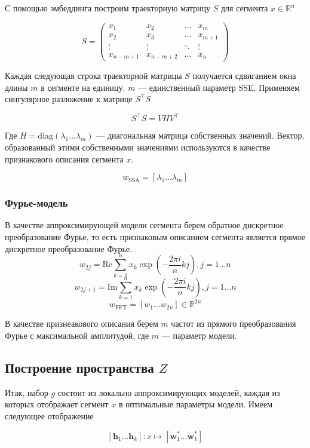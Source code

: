 \documentclass[12pt, fleqn, unicode]{article}
\newcommand{\bw}{\mathbf{w}}
\newcommand{\bh}{\mathbf{h}}
\newcommand{\R}{\mathbb{R}}
\newcommand{\brs}[1]{\left(#1\right)}
\newcommand{\sbrs}[1]{\left[#1\right]}
\begin{document}
С помощью эмбеддинга построим траекторную матрицу $S$ для сегмента $x \in \R^n$

$$
S = \begin{pmatrix}
x_1 & x_2 & \dots & x_m \\
x_2 & x_3 & \dots & x_{m + 1} \\
\vdots & \vdots & \ddots & \vdots \\
x_{n - m + 1} & x_{n - m + 2} & \dots & x_n
\end{pmatrix}
$$

Каждая следующая строка траекторной матрицы $S$ получается сдвиганием окна
длины $m$ в сегменте на единицу. $m$ --- единственный параметр SSE.
Применяем сингулярное разложение к матрице $S^\intercal S$

$$
S^\intercal S = VHV^\intercal
$$

Где $H = \mathrm{diag}(\lambda_1\ldots \lambda_m)$ --- диагональная матрица
собственных значений. Вектор, образованный этими собственными значениями
используются в качестве признакового описания сегмента $x$.

$$
w_{\text{SSA}} = [\lambda_1 \ldots \lambda_m]
$$

\subsubsection{Фурье-модель}

В качестве аппроксимирующей модели сегмента берем обратное дискретное
преобразование Фурье,
то есть признаковым описанием сегмента является прямое дискретное преобразование
Фурье.
$$
    w_{2j} = \mathrm{Re} \sum_{k=1}^{n} x_k \exp\brs{-\frac{2\pi i}{n}kj}, j=1\ldots n
$$
$$
    w_{2j + 1} = \mathrm{Im} \sum_{k=1}^{n} x_k \exp\brs{-\frac{2\pi i}{n}kj}, j=1\ldots n
$$
$$
w_{\text{FFT}} = \sbrs{w_1\ldots w_{2n}}\in \R^{2n}
$$

В качестве признеакового описания берем $m$ частот из прямого преобразования
Фурье с максимальной амплитудой, где $m$ — параметр модели.

\subsection{Построение пространства $Z$}

Итак, набор $g$ состоит из локально аппроксимирующих моделей, каждая из которых
отображает сегмент $x$ в оптимальные параметры модели. Имеем следующее отображение

$$
[\bh_1\ldots \bh_k]: x \mapsto [\bw_1^* \ldots \bw_k^*]
$$
\end{document}
